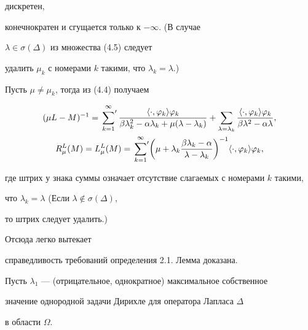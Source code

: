 \begin{pf}
дискретен, 


конечнократен и сгущается только к $-\infty$. (В случае 


$\lambda\in\sigma(\Delta)$ из множества (4.5) следует 


удалить $\mu_k$ с номерами $k$ такими, что $\lambda_k=\lambda$.) 


 


Пусть $\mu\ne\mu_k$, тогда из (4.4) получаем 


\begin{gather*} 


(\mu L-M)^{-1}=\sideset{}{'}\sum^\infty_{k=1} 


\frac{\langle\cdot,\varphi_k\rangle\varphi_k} 


{\beta\lambda^2_k-\alpha\lambda_k+\mu(\lambda-\lambda_k)} 


+\sum_{\lambda=\lambda_k} 


\frac{\langle\cdot,\varphi_k\rangle\varphi_k} 


{\beta\lambda^2-\alpha\lambda},\\ 


% 


R^L_\mu(M)=L^L_\mu(M)=\sideset{}{'}\sum^\infty_{k=1} 


\biggl(\mu+\lambda_k\frac{\beta\lambda_k-\alpha}{\lambda-\lambda_k} 


\biggr)^{-1}\langle\cdot,\varphi_k\rangle\varphi_k, 


\end{gather*} 


где штрих у знака суммы означает отсутствие слагаемых с номерами $k$ такими, 


что $\lambda_k=\lambda$ (Если $\lambda\notin\sigma(\Delta)$, 


то штрих следует удалить.) 


Отсюда легко вытекает 


справедливость требований определения 2.1. Лемма доказана. 


\end{pf} 


 


Пусть $\lambda_1$ --- (отрицательное, однократное) максимальное собственное 


значение однородной задачи Дирихле для оператора Лапласа $\Delta$ 


в области $\Omega$. 


 


